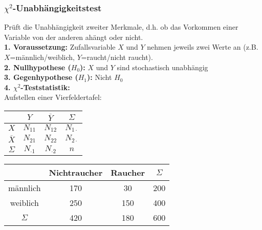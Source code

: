 \subsubsection{\(\chi^2\)-Unabhängigkeitstest}

Prüft die Unabhängigkeit zweiter Merkmale, d.h. ob das Vorkommen einer Variable von der anderen ahängt oder nicht.\\


\textbf{1. Voraussetzung:} Zufallsvariable \(X\) und \(Y\) nehmen jeweils zwei Werte an (z.B. \(X\)=männlich/weiblich, \(Y\)=raucht/nicht raucht).\\

\textbf{2. Nullhypothese (\(H_0\)):} \(X\) und \(Y\) sind stochastisch unabhängig\\

\textbf{3. Gegenhypothese (\(H_1\)):} Nicht \(H_0\)\\

\textbf{4. \(\chi^2\)-Teststatistik:}\\

Aufstellen einer Vierfeldertafel:\\

\begin{minipage}[c]{.4\textwidth}
    \centering
    \begin{tabular}{c|c|c|c}
                   & $Y$           & $\overline{Y}$ & $\Sigma$         \\ 
                   \hline
    $X$            & \(N_{11}\)    & \(N_{12}\)     & \(N_{1 \cdot} \) \\ 
    \hline
    $\overline{X}$ & \(N_{21}\)    & \(N_{22}\)     & \(N_{2\cdot} \)  \\ 
    \hline
    $\Sigma$       & $N_{\cdot 1}$ & $N_{\cdot 2}$  & $n$
    \end{tabular}
\end{minipage}
\begin{minipage}[c]{.6\textwidth}
    \centering
    \begin{tabular}{c|c|c|c}
             & Nichtraucher & Raucher & $\Sigma$ \\ 
    \hline
    männlich & 170          & 30      & 200 \\
    \hline
    weiblich & 250          & 150     & 400  \\
    \hline
    $\Sigma$ & 420          & 180     & 600
    \end{tabular}
\end{minipage}\\\\

